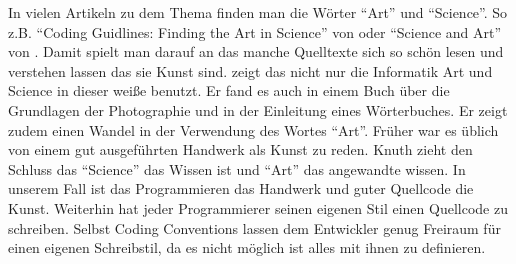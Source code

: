 In vielen Artikeln zu dem Thema finden man die Wörter \enquote{Art} und \enquote{Science}. So z.B.
\enquote{Coding Guidlines: Finding the Art in Science} von \cite{Green} oder \enquote{Science and Art} von \cite[669]{Knuth}.
Damit spielt man darauf an das manche Quelltexte sich so schön lesen und verstehen lassen das sie Kunst sind.
\cite[S. 669]{Knuth} zeigt das nicht nur die Informatik Art und Science in dieser weiße benutzt.
Er fand es auch in einem Buch über die Grundlagen der Photographie und in der Einleitung eines Wörterbuches\cite[S. 669]{Knuth}.
Er zeigt zudem einen Wandel in der Verwendung des Wortes \enquote{Art}.
Früher war es üblich von einem gut ausgeführten Handwerk als Kunst zu reden.
Knuth zieht den Schluss das \enquote{Science} das Wissen ist und \enquote{Art} das angewandte wissen.
In unserem Fall ist das Programmieren das Handwerk und guter Quellcode die Kunst.
Weiterhin hat jeder Programmierer seinen eigenen Stil einen Quellcode zu schreiben.
Selbst Coding Conventions lassen dem Entwickler genug Freiraum für einen eigenen Schreibstil,
da es nicht möglich ist alles mit ihnen zu definieren.
